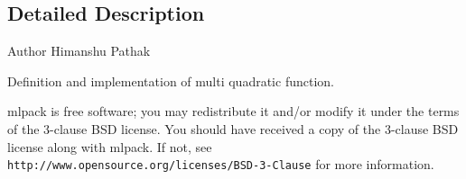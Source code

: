 \subsection{Detailed Description}
\begin{DoxyAuthor}{Author}
Himanshu Pathak
\end{DoxyAuthor}
Definition and implementation of multi quadratic function.

mlpack is free software; you may redistribute it and/or modify it under the terms of the 3-\/clause B\+SD license. You should have received a copy of the 3-\/clause B\+SD license along with mlpack. If not, see {\tt http\+://www.\+opensource.\+org/licenses/\+B\+S\+D-\/3-\/\+Clause} for more information. 
